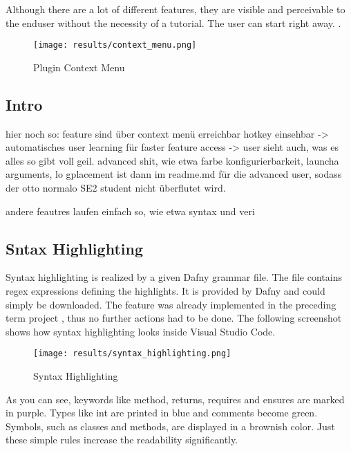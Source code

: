 Although there are a lot of different features, they are visible and perceivable to the enduser without the necessity of a tutorial.
The user can start right away. .

\begin{figure}[H]
    \centering
    \texttt{[image: results/context\_menu.png]}
    \caption{Plugin Context Menu}
    \label{fig:result_contextmenu}
\end{figure}

\subsection{Intro}
hier noch so:
feature sind über context menü erreichbar
hotkey einsehbar -> automatisches user learning für faster feature access
-> user sieht auch, was es alles so gibt
voll geil.
advanced shit, wie etwa farbe konfigurierbarkeit, launcha arguments, lo gplacement ist dann im readme.md für die advanced user, sodass der otto normalo SE2 student nicht überflutet wird.

andere feautres laufen einfach so, wie etwa syntax und veri

\subsection{Sntax Highlighting}
\label{section:result_syntaxhighgliht}
Syntax highlighting is realized by a given Dafny grammar file.
The file contains regex expressions defining the highlights.
It is provided by Dafny  and could simply be downloaded.
The feature was already implemented in the preceding term project \cite{sa}, thus no further actions had to be done.
The following screenshot shows how syntax highlighting looks inside Visual Studio Code.

\begin{figure}[H]
    \centering
    \texttt{[image: results/syntax\_highlighting.png]}
    \caption{Syntax Highlighting}
    \label{fig:result_syntax_highlight}
\end{figure}

As you can see, keywords like method, returns, requires and ensures are marked in purple.
Types like int are printed in blue and comments become green. Symbols, such as classes and
methods, are displayed in a brownish color. Just these simple rules increase the readability
significantly.


